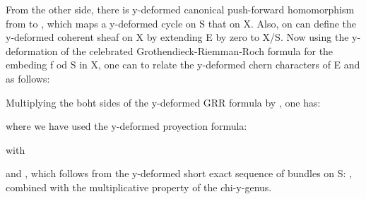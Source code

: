 \documentclass[a4paper,a4paper]{article}
\begin{document}
\begin{center}
\setlength{\baselineskip}{40pt}
{  \coordHE{} }

\end{center}

From the other side, there is y-deformed canonical push-forward homomorphism
\coordHE{} from \coordHE{} to \coordHE{}, which
maps a y-deformed cycle on S that on X. Also, on can define the y-deformed coherent sheaf \coordHE{} on X by extending E by zero to X/S. Now using the y-deformation of the celebrated Grothendieck-Riemman-Roch formula for the embeding f od S in X, one can to relate the y-deformed chern characters of E and \coordHE{} as follows:

\begin{center}
{  \coordHE{} }
\end{center}

Multiplying the boht sides of the y-deformed GRR formula by \coordHE{} , one has:

\begin{center}
{  \coordHE{} }
\end{center}






where we have used the y-deformed proyection formula:

 \begin{center}
{  \coordHE{} }

\end{center}

with  \coordHE{}

and \coordHE{}  , which follows from the y-deformed short exact sequence of bundles on S: \coordHE{}, combined with the multiplicative property of the chi-y-genus.
\end{document}
